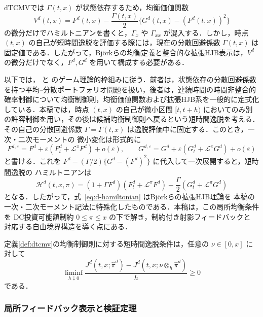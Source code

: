 \documentclass[10pt,a4paper]{article}
\theoremstyle{plain}
\theoremstyle{definition}
\newcommand{\Lop}{\mathcal{L}}
\newcommand{\Hamil}{\mathcal{H}}
\begin{document}
dTCMVでは $\Gamma(t,x)$ が状態依存するため，均衡価値関数
\[
  V^d(t,x)=F^d(t,x)-\frac{\Gamma(t,x)}{2}\{G^d(t,x)-(F^d(t,x))^2\}
\]
の微分だけでハミルトニアンを書くと，$\Gamma_x$ や $\Gamma_{xx}$ が混入する．しかし，時点 $(t,x)$ の自己が短時間逸脱を評価する際には，現在の分散回避係数 $\Gamma(t,x)$ は固定値である．したがって，Björkらの均衡定義と整合的な拡張HJB表示は，$V^d$ の微分だけでなく，$F^d,G^d$ を用いて構成する必要がある．

以下では，\citet{BjorkMurgociZhou2014} と\citet{BjorkKhapkoMurgoci2017} のゲーム理論的枠組みに従う．前者は，状態依存の分散回避係数を持つ平均--分散ポートフォリオ問題を扱い，後者は，連続時間の時間非整合的確率制御について均衡制御則，均衡価値関数および拡張HJB系を一般的に定式化している．本稿では，時点 $(t,x)$ の自己が微小区間 $[t,t+h)$ においてのみ別の許容制御を用い，その後は候補均衡制御則へ戻るという短時間逸脱を考える．その自己の分散回避係数
$\Gamma=\Gamma(t,x)$ は逸脱評価中に固定する．このとき，一次・二次モーメントの
微小変化は形式的に
\[
  F^{d,\varepsilon}
  =F^d+\varepsilon(F_t^d+\Lop^\pi F^d)+o(\varepsilon),
  \qquad
  G^{d,\varepsilon}
  =G^d+\varepsilon(G_t^d+\Lop^\pi G^d)+o(\varepsilon)
\]
と書ける．これを
$F^d-(\Gamma/2)\{G^d-(F^d)^2\}$ に代入して一次展開すると，短時間逸脱の
ハミルトニアンは
\begin{equation}
  \Hamil^d(t,x,\pi)
  =
  (1+\Gamma F^d)(F_t^d+\Lop^\pi F^d)
  -\frac{\Gamma}{2}(G_t^d+\Lop^\pi G^d)
  \label{eq:d-hamiltonian}
\end{equation}
となる．したがって，式~\eqref{eq:d-hamiltonian} はBjörkらの拡張HJB理論を
本稿の一次・二次モーメント記法に特殊化したものである．本稿は，この局所均衡条件を
DC投資可能額制約 $0\leq\pi\leq x$ の下で解き，制約付き射影フィードバックと
対応する自由境界構造を導く点にある．

定義\ref{def:dtcmv}の均衡制御則に対する短時間逸脱条件は，任意の
$\nu\in[0,x]$ に対して
\begin{equation}
  \liminf_{h\downarrow0}
  \frac{J^d(t,x;\hat\pi^d)-J^d(t,x;\nu\otimes_h\hat\pi^d)}{h}
  \geq0
  \label{eq:d-equilibrium}
\end{equation}
である．

\subsubsection{局所フィードバック表示と検証定理}
\end{document}
